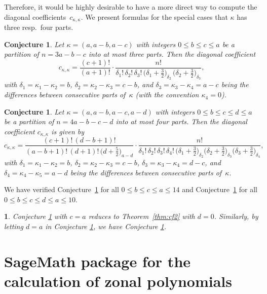 \documentclass[smallextended]{svjour3}
\newtheorem{rem}[thm]{\protect\remarkname}
\newtheorem{conj}[thm]{Conjecture}
\providecommand{\remarkname}{Remark}
\begin{document}
Therefore, it would be highly desirable to have a more direct way to compute
the diagonal coefficients~$c_{\kappa,\kappa}$. We present formulas for the
special cases that $\kappa$ has three resp.\ four parts.

\begin{conj}\label{conj:diag3}
  Let $\kappa=(a,a-b,a-c)$ with integers $0\leq b\leq c\leq a$ be a partition
  of $n=3a-b-c$ into at most three parts. Then the diagonal coefficient
 \[ 
 c_{\kappa,\kappa}=\frac{(c+1)!}{(a+1)!} \cdot \frac{n!}{\delta_1! \, \delta_2! \, \delta_3! \,
     \bigl(\delta_1+\frac32\bigr)_{\!\delta_2} \, \bigl(\delta_2+\frac32\bigr)_{\!\delta_3}}, 
 \] 
  with $\delta_1=\kappa_1-\kappa_2=b$, $\delta_2=\kappa_2-\kappa_3=c-b$, and
  $\delta_3=\kappa_3-\kappa_4=a-c$ being the differences between consecutive
  parts of~$\kappa$ (with the convention $\kappa_4=0$).
\end{conj}

\begin{conj}\label{conj:diag4}
  Let $\kappa=(a,a-b,a-c,a-d)$ with integers $0\leq b\leq c\leq d\leq a$ be a
  partition of $n=4a-b-c-d$ into at most four parts. Then the diagonal
  coefficient $c_{\kappa,\kappa}$ is given by
 \[ 
c_{\kappa,\kappa}=\frac{(c+1)! \, (d-b+1)!}{(a-b+1)! \, (d+1)! \,  \bigl(d+\frac52\bigr)_{\!a-d}}
    \cdot \frac{n!}{\delta_1! \, \delta_2! \, \delta_3! \, \delta_4! \,
      \bigl(\delta_1+\frac32\bigr)_{\!\delta_2} \bigl(\delta_2+\frac32\bigr)_{\!\delta_3} \bigl(\delta_3+\frac32\bigr)_{\!\delta_4}},  
\]  
  with $\delta_1=\kappa_1-\kappa_2=b$, $\delta_2=\kappa_2-\kappa_3=c-b$,
  $\delta_3=\kappa_3-\kappa_4=d-c$, and $\delta_4=\kappa_4-\kappa_5=a-d$ being
  the differences between consecutive parts of~$\kappa$.
\end{conj}

We have verified Conjecture~\ref{conj:diag3} for all $0\leq b\leq c\leq a\leq
14$ and Conjecture~\ref{conj:diag4} for all $0\leq b\leq c\leq d\leq a\leq
10$.

\begin{rem}
Conjecture \ref{conj:diag3} with $c=a$ reduces to  Theorem~\ref{thm:cf2}  with $d=0$. Similarly, by letting $d=a$ in
Conjecture \ref{conj:diag4}, we have Conjecture \ref{conj:diag3}. 
\end{rem}


\section{SageMath package for the calculation of zonal polynomials}\label{sec:Package}
\end{document}
